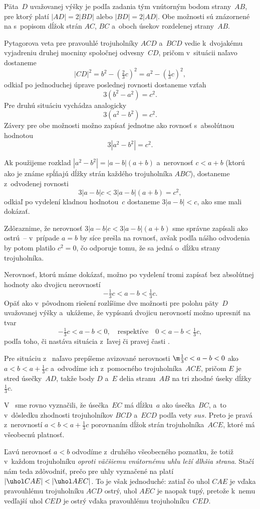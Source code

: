 {%
Päta~$D$ uvažovanej výšky je podľa zadania
tým vnútorným bodom strany~$AB$, pre ktorý platí $|AD|=2|BD|$ alebo
$|BD|=2|AD|$. Obe možnosti sú znázornené na \obr{}
s~popisom dĺžok strán $AC$, $BC$ a~oboch úsekov rozdelenej strany~$AB$.
%

Pytagorova veta pre pravouhlé trojuholníky
$ACD$ a~$BCD$ vedie k~dvojakému vyjadreniu druhej mocniny spoločnej odvesny~$CD$,
pričom v~situácii naľavo dostaneme
$$
|CD|^2=b^2-(\tfrac23c)^2=a^2-(\tfrac13c)^2,
$$
odkiaľ po jednoduchej úprave poslednej rovnosti dostaneme vzťah
$$
3(b^2-a^2)=c^2.
$$
Pre druhú situáciu vychádza analogicky
$$
3(a^2-b^2)=c^2.
$$
Závery pre obe možnosti možno zapísať jednotne ako rovnosť
s~absolútnou hodnotou
$$
3|a^2-b^2|=c^2.
$$

Ak použijeme rozklad $|a^2-b^2|=|a-b|(a+b)$ a~nerovnosť
$c<a+b$ (ktorú ako je známe spĺňajú dĺžky strán každého trojuholníka $ABC$),
dostaneme z~odvodenej rovnosti
$$
3|a-b|c<3|a-b|(a+b)=c^2,
$$
odkiaľ po vydelení kladnou hodnotou~$c$ dostaneme $3|a-b|<c$, ako
sme mali dokázať.

Zdôraznime, že nerovnosť
$3|a-b|c<3|a-b|(a+b)$ sme správne zapísali ako ostrú~--
v~prípade $a=b$ by síce prešla na rovnosť,
avšak podľa nášho odvodenia by potom platilo $c^2=0$, čo odporuje tomu,
že sa jedná o~dĺžku strany trojuholníka.

\ineriesenie
Nerovnosť, ktorú máme dokázať, možno po vydelení tromi zapísať
bez absolútnej hodnoty ako dvojicu nerovností
$$
-\tfrac13 c<a-b<\tfrac13 c.
$$
Opäť ako v~pôvodnom riešení rozlíšime dve možnosti pre polohu
päty~$D$ uvažovanej výšky a~ukážeme, že vypísanú dvojicu
nerovností možno upresniť na tvar
$$
-\tfrac13 c<a-b<0,\quad\text{respektíve}\quad 0<a-b<\tfrac13 c,
$$
podľa toho, či nastáva situácia z~ľavej či pravej časti .

Pre situáciu z~ naľavo prepíšeme
avizované nerovnosti ${\m\frac13}c<a-b<0$ ako
$a<b<a+\frac13 c$ a~odvodíme ich z~pomocného trojuholníka~$ACE$, pričom $E$
je stred úsečky~$AD$, takže body $D$ a~$E$ delia stranu~$AB$ na
tri zhodné úseky dĺžky $\frac13 c$.
%

V~\obr{} sme rovno vyznačili, že úsečka~$EC$ má dĺžku~$a$ ako
úsečka~$BC$, a~to v~dôsledku zhodnosti trojuholníkov $BCD$ a~$ECD$ podľa
vety $sus$. Preto je pravá z~nerovností $a<b<a+\frac13 c$
porovnaním dĺžok strán trojuholníka~$ACE$, ktoré má všeobecnú platnosť.

Ľavú nerovnosť $a<b$ odvodíme z~druhého všeobecného poznatku, že
totiž v~každom trojuholníku {\it oproti väčšiemu vnútornému uhlu leží
dlhšia strana}. Stačí
nám teda zdôvodniť, prečo pre uhly vyznačené na  platí
$|\uhol CAE|<|\uhol AEC|$. To je však jednoduché:
zatiaľ čo uhol $CAE$ je vďaka pravouhlému trojuholníku $ACD$ ostrý,
uhol $AEC$ je naopak tupý, pretože k~nemu vedľajší uhol $CED$ je
ostrý vďaka pravouhlému trojuholníku~$CED$.

}
